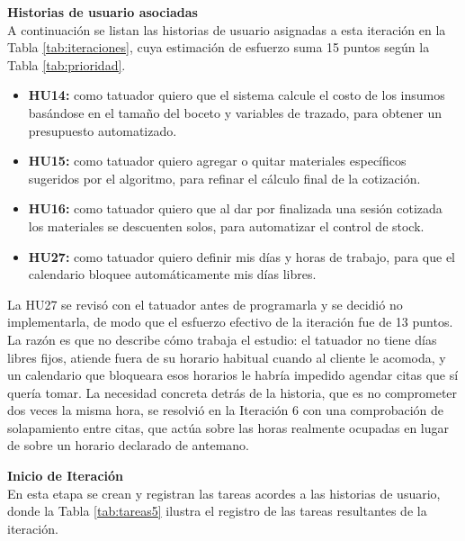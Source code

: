 \documentclass[12pt,letterpaper,oneside]{report}
\newcommand{\tituloparpegado}[1]{\par\textbf{#1}\\\indent\ignorespaces}
\begin{document}
\vspace{0.3cm}
\tituloparpegado{Historias de usuario asociadas}
A continuación se listan las historias de usuario asignadas a esta iteración en la Tabla \ref{tab:iteraciones}, cuya estimación de esfuerzo suma 15 puntos según la Tabla \ref{tab:prioridad}.

\begin{itemize}
  \item \textbf{HU14:} como tatuador quiero que el sistema calcule el costo de los insumos basándose en el tamaño del boceto y variables de trazado, para obtener un presupuesto automatizado.
  \item \textbf{HU15:} como tatuador quiero agregar o quitar materiales específicos sugeridos por el algoritmo, para refinar el cálculo final de la cotización.
  \item \textbf{HU16:} como tatuador quiero que al dar por finalizada una sesión cotizada los materiales se descuenten solos, para automatizar el control de stock.
  \item \textbf{HU27:} como tatuador quiero definir mis días y horas de trabajo, para que el calendario bloquee automáticamente mis días libres.
\end{itemize}

La HU27 se revisó con el tatuador antes de programarla y se decidió no implementarla, de modo que el esfuerzo efectivo de la iteración fue de 13 puntos. La razón es que no describe cómo trabaja el estudio: el tatuador no tiene días libres fijos, atiende fuera de su horario habitual cuando al cliente le acomoda, y un calendario que bloqueara esos horarios le habría impedido agendar citas que sí quería tomar. La necesidad concreta detrás de la historia, que es no comprometer dos veces la misma hora, se resolvió en la Iteración 6 con una comprobación de solapamiento entre citas, que actúa sobre las horas realmente ocupadas en lugar de sobre un horario declarado de antemano.

\vspace{0.3cm}
\tituloparpegado{Inicio de Iteración}
En esta etapa se crean y registran las tareas acordes a las historias de usuario, donde la Tabla \ref{tab:tareas5} ilustra el registro de las tareas resultantes de la iteración.
\end{document}
